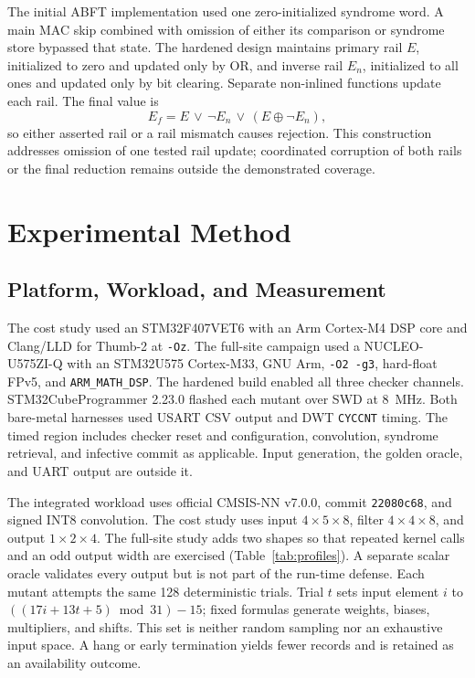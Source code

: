 \documentclass[conference]{IEEEtran}
\begin{document}
The initial ABFT implementation used one zero-initialized syndrome word. A main MAC skip combined with omission of either its comparison or syndrome store bypassed that state. The hardened design maintains primary rail $E$, initialized to zero and updated only by OR, and inverse rail $E_n$, initialized to all ones and updated only by bit clearing. Separate non-inlined functions update each rail. The final value is
\begin{equation}
 E_f=E\,\lor\,\neg E_n\,\lor\,(E\oplus\neg E_n),
\end{equation}
so either asserted rail or a rail mismatch causes rejection. This construction addresses omission of one tested rail update; coordinated corruption of both rails or the final reduction remains outside the demonstrated coverage.

\section{Experimental Method}
\subsection{Platform, Workload, and Measurement}
The cost study used an STM32F407VET6 with an Arm Cortex-M4 DSP core and Clang/LLD for Thumb-2 at \texttt{-Oz}. The full-site campaign used a NUCLEO-U575ZI-Q with an STM32U575 Cortex-M33, GNU Arm, \texttt{-O2 -g3}, hard-float FPv5, and \texttt{ARM\_MATH\_DSP}. The hardened build enabled all three checker channels. STM32CubeProgrammer 2.23.0 flashed each mutant over SWD at 8~MHz. Both bare-metal harnesses used USART CSV output and DWT \texttt{CYCCNT} timing. The timed region includes checker reset and configuration, convolution, syndrome retrieval, and infective commit as applicable. Input generation, the golden oracle, and UART output are outside it.

The integrated workload uses official CMSIS-NN v7.0.0, commit \texttt{22080c68}, and signed INT8 convolution. The cost study uses input $4\times5\times8$, filter $4\times4\times8$, and output $1\times2\times4$. The full-site study adds two shapes so that repeated kernel calls and an odd output width are exercised (Table~\ref{tab:profiles}). A separate scalar oracle validates every output but is not part of the run-time defense. Each mutant attempts the same 128 deterministic trials. Trial $t$ sets input element $i$ to $((17i+13t+5)\bmod31)-15$; fixed formulas generate weights, biases, multipliers, and shifts. This set is neither random sampling nor an exhaustive input space. A hang or early termination yields fewer records and is retained as an availability outcome.
\end{document}
